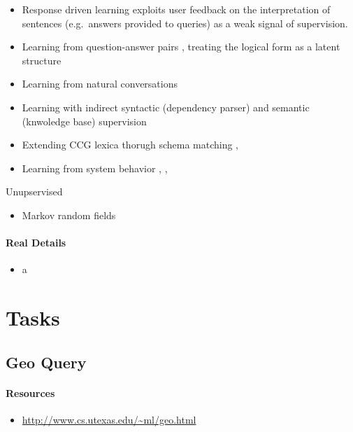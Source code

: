 \documentclass{article}
\begin{document}
\begin{itemize}
\item Response driven learning \cite{Clarke2010response} exploits user feedback on the interpretation of sentences (e.g.~answers provided to queries) as a weak signal of supervision.  
\item Learning from question-answer pairs \cite{Liang2013learning}, treating the logical form as a latent structure 
\item Learning from natural conversations \cite{Artzi2011conversations}
\item Learning with indirect syntactic (dependency parser) and semantic (knwoledge base) supervision \cite{Krishnamurthy2012weakly}
\item Extending CCG lexica thorugh schema matching \cite{Cai2013semantic}, \cite{Kwiatkowski2013ontology}
\item Learning from system behavior \cite{Goldwasser2011instructions}, \cite{Chen2011instructions}, \cite{Artzi2013weakly}
\end{itemize}

Unupservised
\begin{itemize}
\item Markov random fields \cite{Poon2009unsupervised}
\end{itemize}

\paragraph{Real Details} 

\begin{itemize}
\item a
\end{itemize}

\section{Tasks} 

\subsection{Geo Query}

\paragraph{Resources}
\begin{itemize}
\item \url{http://www.cs.utexas.edu/~ml/geo.html}
\end{itemize}
\end{document}
